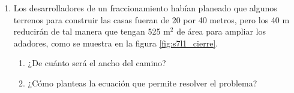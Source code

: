 \documentclass[11pt]{book}
\begin{document}
\begin{boxK}
\begin{minipage}[t]{0.8\textwidth}
\begin{enumerate}
      \item Los desarrolladores de un fraccionamiento habían planeado que algunos
            terrenos para construir las casas fueran de 20 por 40 metros, pero los
            40 m
            reducirán de tal manera que tengan 525 m$^2$ de área para ampliar los adadores, como se muestra en la figura \ref{fig:s7l1_cierre}.
            \begin{enumerate}
              \item ¿De cuánto será el ancho del camino?
              \item ¿Cómo planteas la ecuación que permite resolver el problema?
            \end{enumerate}
    \end{enumerate}
  \end{minipage}


\end{boxK}

\newpage
\end{document}
